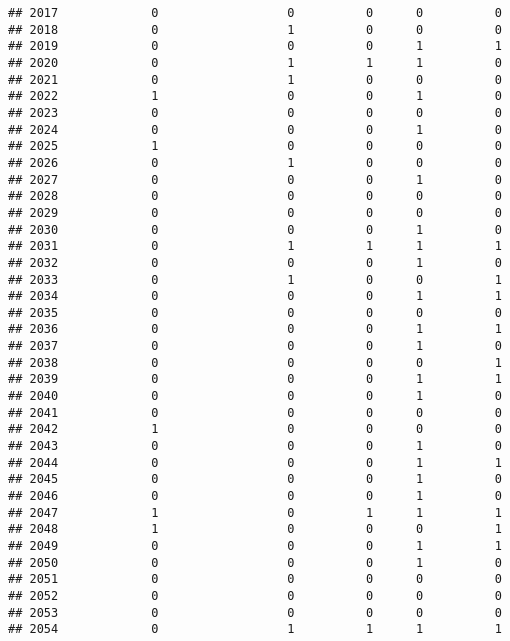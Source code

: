 \documentclass[
]{article}
\begin{document}
\begin{verbatim}
## 2017             0                  0          0      0          0
## 2018             0                  1          0      0          0
## 2019             0                  0          0      1          1
## 2020             0                  1          1      1          0
## 2021             0                  1          0      0          0
## 2022             1                  0          0      1          0
## 2023             0                  0          0      0          0
## 2024             0                  0          0      1          0
## 2025             1                  0          0      0          0
## 2026             0                  1          0      0          0
## 2027             0                  0          0      1          0
## 2028             0                  0          0      0          0
## 2029             0                  0          0      0          0
## 2030             0                  0          0      1          0
## 2031             0                  1          1      1          1
## 2032             0                  0          0      1          0
## 2033             0                  1          0      0          1
## 2034             0                  0          0      1          1
## 2035             0                  0          0      0          0
## 2036             0                  0          0      1          1
## 2037             0                  0          0      1          0
## 2038             0                  0          0      0          1
## 2039             0                  0          0      1          1
## 2040             0                  0          0      1          0
## 2041             0                  0          0      0          0
## 2042             1                  0          0      0          0
## 2043             0                  0          0      1          0
## 2044             0                  0          0      1          1
## 2045             0                  0          0      1          0
## 2046             0                  0          0      1          0
## 2047             1                  0          1      1          1
## 2048             1                  0          0      0          1
## 2049             0                  0          0      1          1
## 2050             0                  0          0      1          0
## 2051             0                  0          0      0          0
## 2052             0                  0          0      0          0
## 2053             0                  0          0      0          0
## 2054             0                  1          1      1          1

\end{verbatim}
\end{document}
